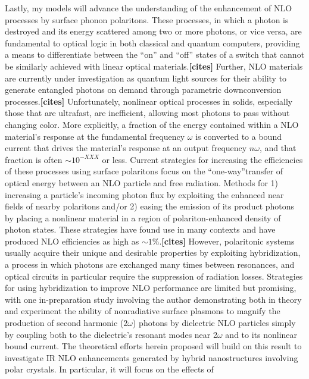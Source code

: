 \documentclass[11pt,a4paper]{article}
\begin{document}
Lastly, my models will advance the understanding of the enhancement of NLO processes by surface phonon polaritons. These processes, in which a photon is destroyed and its energy scattered among two or more photons, or vice versa, are fundamental to optical logic in both classical and quantum computers, providing a means to differentiate between the ``on'' and ``off'' states of a switch that cannot be similarly achieved with linear optical materials.\textbf{[cites]} Further, NLO materials are currently under investigation as quantum light sources for their ability to generate entangled photons on demand through parametric downconversion processes.\textbf{[cites]} Unfortunately, nonlinear optical processes in solids, especially those that are ultrafast, are inefficient, allowing most photons to pass without changing color. More explicitly, a fraction of the energy contained within a NLO material's response at the fundamental frequency $\omega$ is converted to a bound current that drives the material's response at an output frequency $n\omega$, and that fraction is often $\sim10^{-XXX}$ or less. Current strategies for increasing the efficiencies of these processes using surface polaritons focus on the ``one-way''transfer of optical energy between an NLO particle and free radiation. Methods for 1) increasing a particle's incoming photon flux by exploiting the enhanced near fields of nearby polaritons and/or 2) easing the emission of its product photons by placing a nonlinear material in a region of polariton-enhanced density of photon states. These strategies have found use in many contexts and have produced NLO efficiencies as high as $\sim1\%$.\textbf{[cites]} However, polaritonic systems usually acquire their unique and desirable properties by exploiting hybridization, a process in which photons are exchanged many times between resonances, and optical circuits in particular require the suppression of radiation losses. Strategies for using hybridization to improve NLO performance are limited but promising, with one in-preparation study involving the author demonstrating both in theory and experiment the ability of nonradiative surface plasmons to magnify the production of second harmonic ($2\omega$) photons by dielectric NLO particles simply by coupling both to the dielectric's resonant modes near 2$\omega$ and to its nonlinear bound current. The theoretical efforts herein proposed will build on this result to investigate IR NLO enhancements generated by hybrid nanostructures involving polar crystals. In particular, it will focus on the effects of  
\end{document}
